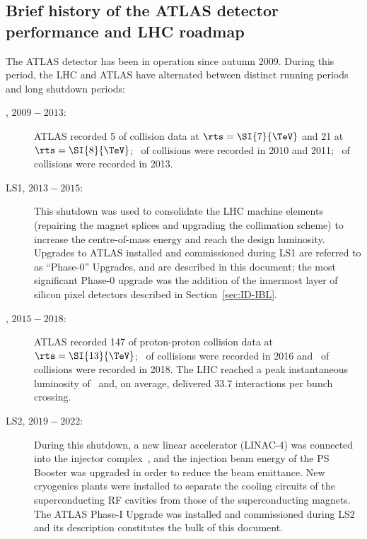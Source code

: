 \documentclass[cernpreprint, atlasdraft=false, UKenglish,british,orcidlogo, texmf, orcidlogo]{atlasdoc}
\begin{document}
 
\subsection{Brief history of the ATLAS detector performance and LHC roadmap}
 
The ATLAS detector has been in operation since autumn 2009. During this period, the \gls{LHC} and ATLAS have alternated between distinct running periods and long shutdown periods:
\begin{description}
\item[\RunOne, $2009-2013$:] ATLAS recorded \SI{5}{\ifb} of \pp collision data at $\rts = \SI{7}{\TeV}$ and \SI{21}{\ifb} at $\rts = \SI{8}{\TeV}$; \intlumiPbPbrunone\ of \PbPb collisions were recorded in 2010 and 2011; \intlumipPbrunone\ of \pPb collisions were recorded in 2013.
 
\item[\gls{LS1}, $2013-2015$:] This shutdown was used to consolidate the \gls{LHC} machine elements (repairing the magnet splices and upgrading the collimation scheme) to increase the centre-of-mass energy and reach the design luminosity. 
Upgrades to ATLAS installed and commissioned during \gls{LS1} are referred to as ``Phase-0'' Upgrades, and are described in this document; the most significant Phase-0 upgrade was the addition of the innermost layer of silicon pixel detectors described in Section~\ref{sec:ID-IBL}.
 
\item[\RunTwo, $2015-2018$:] ATLAS recorded \SI{147}{\ifb} of proton-proton collision data at $\rts = \SI{13}{\TeV}$; \intlumipPbruntwo\ of \pPb collisions were recorded in 2016 and \intlumiPbPbruntwo\ of \PbPb collisions were recorded in 2018. The \gls{LHC} reached a peak instantaneous luminosity of \lumiruntwopeak\ and, on average, delivered \num{33.7} interactions per bunch crossing.
 
\item[\gls{LS2}, $2019-2022$:] During this shutdown, a new linear accelerator (\gls{LINAC-4}) was connected into the injector complex~\cite{LHCcontributionInThisJournal}, and
the injection beam energy of the \gls{PS} Booster was upgraded in order to reduce the beam emittance. New cryogenics plants were installed to separate the cooling circuits of the superconducting \gls{RF} cavities from those of the superconducting magnets. The ATLAS Phase-I Upgrade was installed and commissioned during \gls{LS2} and its description constitutes the bulk of this document.
 

\end{description}
\end{document}
